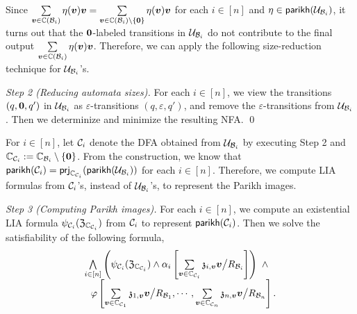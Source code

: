 Since
$\sum \limits_{\myvec{v} \in \costset(\cB_i)} \eta(\myvec{v}) \myvec{v} = \sum \limits_{\myvec{v} \in \costset(\cB_i) \setminus \{\myvec{0}\}} \eta(\myvec{v}) \myvec{v}$ for each $i \in [n]$ and $\eta \in \mathsf{parikh}(\mathcal{U}_{\mathcal{B}_i})$, it turns out that 
the $\myvec{0}$-labeled transitions in $\mathcal{U}_{\mathcal{B}_i}$ do not contribute to the final output $\sum \limits_{\myvec{v} \in \costset(\cB_i)} \eta(\myvec{v}) \myvec{v}$. Therefore, we can apply the following size-reduction technique for $\mathcal{U}_{\mathcal{B}_i}$'s.

\medskip
\noindent
\emph{Step 2 (Reducing automata sizes).} For each $i \in [n]$, we view the transitions $(q, \myvec{0}, q')$ in $\mathcal{U}_{\mathcal{B}_i}$ as $\varepsilon$-transitions $(q, \varepsilon, q')$, and remove the $\varepsilon$-transitions from $\mathcal{U}_{\mathcal{B}_i}$. Then we determinize and minimize the resulting NFA.   \qed

For $i \in [n]$, let  $\mathcal{C}_i$ denote the DFA obtained from $\mathcal{U}_{\mathcal{B}_i}$ by executing Step 2 and $\costset_{\cC_i} := \costset_{\cB_i} \setminus \{\myvec{0}\}$. From the construction, we know that $\mathsf{parikh}(\mathcal{C}_i) = {\sf prj}_{\mathbb{C}_{\mathcal{C}_i}}(\mathsf{parikh}(\mathcal{U}_{\mathcal{B}_i}))$ for each $i \in [n]$.
Therefore, we compute LIA formulas from $\mathcal{C}_i$'s, instead of $\mathcal{U}_{\mathcal{B}_i}$'s, to represent the Parikh images. 

\medskip
\noindent
\emph{Step 3 (Computing Parikh images).} For each $i \in [n]$, we compute an existential LIA formula $\psi_{\mathcal{C}_i}(\mathfrak{Z}_{\mathbb{C}_{\mathcal{C}_i}})$ from $\mathcal{C}_i$ to represent $\mathsf{parikh}(\mathcal{C}_i)$. Then we solve the satisfiability of the following formula,
%
\[
\begin{array}{l}
\bigwedge \limits_{i \in [n]} \left(\psi_{\cC_i}(\fZ_{\costset_{\cC_i}}) \wedge \alpha_i\left[\sum\limits_{\myvec{v} \in \costset_{\cC_i}} \anivarz_{i, \myvec{v}} \myvec{v} \big{/}R_{\cB_i}  \right] \right) \ \wedge \\
\ \ \varphi \left[ \sum\limits_{\myvec{v} \in \costset_{\cC_1}} \anivarz_{1, \myvec{v}} \myvec{v} \big{/}R_{\cB_1}, \cdots, \sum\limits_{\myvec{v} \in \costset_{\cC_n}} \anivarz_{n, \myvec{v}} \myvec{v} \big{/}R_{\cB_n} \right].
\end{array}
\]
